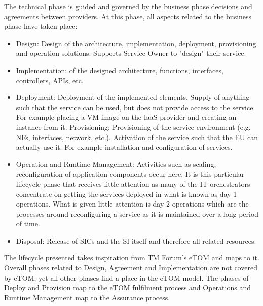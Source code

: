         The technical phase is guided and governed by the business phase decisions and agreements between providers. At this phase, all aspects related to the business phase have taken place:
        \begin{itemize}
            \item Design: Design of the architecture, implementation, deployment, provisioning and operation solutions. Supports Service Owner to "design" their service.
            \item Implementation: of the designed architecture, functions, interfaces, controllers, APIs, etc.
            \item Deployment: Deployment of the implemented elements. Supply of anything such that the service can be used, but does not provide access to the service. For example placing a VM image on the IaaS provider and creating an instance from it.
            Provisioning: Provisioning of the service environment (e.g. NFs, interfaces, network, etc.). Activation of the service such that the EU can actually use it. For example installation and configuration of services.
            \item Operation and Runtime Management: Activities such as scaling, reconfiguration of application components occur here. It is this particular lifecycle phase that receives little attention as many of the IT orchestrators concentrate on getting the services deployed in what is known as day-1 operations. What is given little attention is day-2 operations which are the processes around reconfiguring a service as it is maintained over a long period of time.
            \item Disposal: Release of SICs and the SI itself and therefore all related resources.
        \end{itemize}
        The lifecycle presented takes inspiration from TM Forum's eTOM \addref{} and maps to it. Overall phases related to Design, Agreement and Implementation are not covered by eTOM, yet all other phases find a place in the eTOM model. The phases of Deploy and Provision map to the eTOM fulfilment process and Operations and Runtime Management map to the Assurance process.
        
